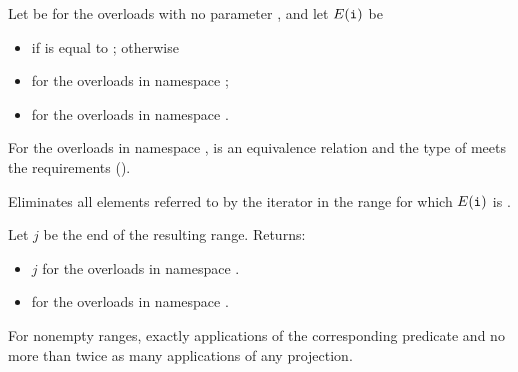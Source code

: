 \begin{itemdescr}
\pnum
Let  be 
for the overloads with no parameter , and
let $E(\tcode{i})$ be
\begin{itemize}
\setlength{\emergencystretch}{1em}
\item
   if  is equal to ; otherwise
\item
  for the overloads in namespace ;
\item
  for the overloads in namespace .
\end{itemize}

\pnum
\expects
For the overloads in namespace ,
 is an equivalence relation and
the type of  meets
the  requirements ().

\pnum
\effects
Eliminates all elements referred to
by the iterator  in the range 
for which $E(\tcode{i})$ is .

\pnum
\returns
Let $j$ be the end of the resulting range. Returns:
\begin{itemize}
\item $j$ for the overloads in namespace .
\item {} for the overloads in namespace .
\end{itemize}

\pnum
\complexity
For nonempty ranges, exactly  applications
of the corresponding predicate and
no more than twice as many applications of any projection.
\end{itemdescr}

